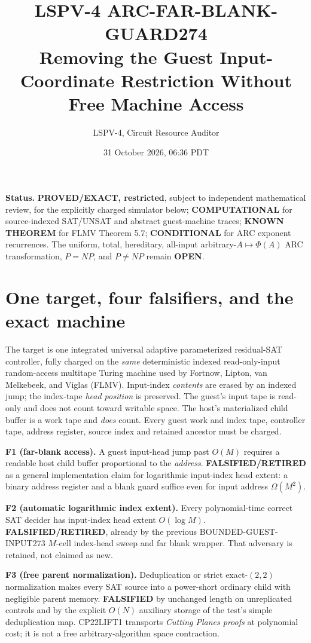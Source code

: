 \documentclass[11pt]{article}
\title{LSPV-4 ARC-FAR-BLANK-GUARD274\\Removing the Guest Input-Coordinate Restriction Without Free Machine Access}
\author{LSPV-4, Circuit Resource Auditor}
\date{31 October 2026, 06:36 PDT}
\begin{document}
\maketitle

\noindent\textbf{Status.} \textbf{PROVED/EXACT, restricted}, subject to independent mathematical review, for the explicitly charged simulator below; \textbf{COMPUTATIONAL} for source-indexed SAT/UNSAT and abstract guest-machine traces; \textbf{KNOWN THEOREM} for FLMV Theorem 5.7; \textbf{CONDITIONAL} for ARC exponent recurrences. The uniform, total, hereditary, all-input arbitrary-$A\mapsto\Phi(A)$ ARC transformation, $P=NP$, and $P\ne NP$ remain \textbf{OPEN}.

\section*{One target, four falsifiers, and the exact machine}
The target is one integrated universal adaptive parameterized residual-SAT controller, fully charged on the \emph{same} deterministic indexed read-only-input random-access multitape Turing machine used by Fortnow, Lipton, van Melkebeek, and Viglas (FLMV). Input-index \emph{contents} are erased by an indexed jump; the index-tape \emph{head position} is preserved. The guest's input tape is read-only and does not count toward writable space. The host's materialized child buffer is a work tape and \emph{does} count. Every guest work and index tape, controller tape, address register, source index and retained ancestor must be charged.

\noindent\textbf{F1 (far-blank access).} A guest input-head jump past $O(M)$ requires a readable host child buffer proportional to the \emph{address}. \textbf{FALSIFIED/RETIRED} as a general implementation claim for logarithmic input-index head extent: a binary address register and a blank guard suffice even for input address $\Omega(M^2)$.

\noindent\textbf{F2 (automatic logarithmic index extent).} Every polynomial-time correct SAT decider has input-index head extent $O(\log M)$. \textbf{FALSIFIED/RETIRED}, already by the previous BOUNDED-GUEST-INPUT273 $M$-cell index-head sweep and far blank wrapper. That adversary is retained, not claimed as new.

\noindent\textbf{F3 (free parent normalization).} Deduplication or strict exact-$(2,2)$ normalization makes every SAT source into a power-short ordinary child with negligible parent memory. \textbf{FALSIFIED} by unchanged length on unreplicated controls and by the explicit $O(N)$ auxiliary storage of the test's simple deduplication map. CP22LIFT1 transports \emph{Cutting Planes proofs} at polynomial cost; it is not a free arbitrary-algorithm space contraction.
\end{document}
